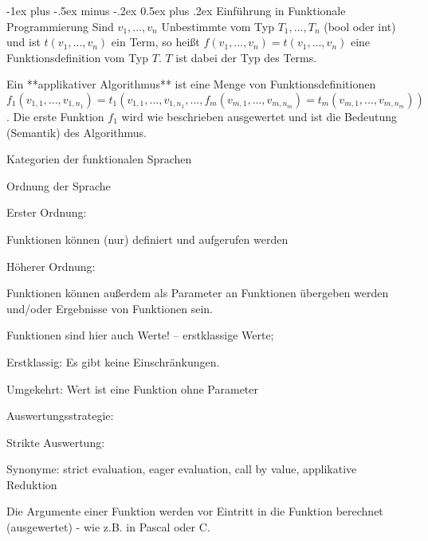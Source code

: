 \documentclass[10pt]{article}
\makeatletter
\renewcommand{\section}{\@startsection{section}{1}{0mm}%
                                {-1ex plus -.5ex minus -.2ex}%
                                {0.5ex plus .2ex}%
                                {\normalfont\large\bfseries}}
\makeatother
\begin{document}
\section{Einführung in Funktionale Programmierung}
Sind $v_1, ..., v_n$ Unbestimmte vom Typ $T_1, ..., T_n$ (bool oder int) und ist $t(v_1,...,v_n)$ ein Term, so heißt $f(v_1,...,v_n)= t(v_1,...,v_n)$ eine Funktionsdefinition vom Typ $T$. $T$ ist dabei der Typ des Terms.

Ein **applikativer Algorithmus** ist eine Menge von Funktionsdefinitionen $f_1(v_{1,1}, ..., v_{1,n_1}) = t_1(v_{1,1},...,v_{1,n_1},..., f_m(v_{m,1},...,v_{m,n_m}) = t_m(v_{m,1},..., v_{m,n_m}))$. Die erste Funktion $f_1$ wird wie beschrieben ausgewertet und ist die Bedeutung (Semantik) des Algorithmus.

Kategorien der funktionalen Sprachen
\begin{itemize*}
  \item Ordnung der Sprache
  \begin{itemize*}
    \item Erster Ordnung:
    \begin{itemize*}
      \item Funktionen können (nur) definiert und aufgerufen werden
    \end{itemize*}
    \item Höherer Ordnung:
    \begin{itemize*}
      \item Funktionen können außerdem als Parameter an Funktionen übergeben werden und/oder Ergebnisse von Funktionen sein.
      \item Funktionen sind hier auch Werte! -- erstklassige Werte;
      \item Erstklassig: Es gibt keine Einschränkungen.
      \item Umgekehrt: Wert ist eine Funktion ohne Parameter
    \end{itemize*}
  \end{itemize*}
  \item Auswertungsstrategie:
  \begin{itemize*}
    \item Strikte Auswertung:
    \begin{itemize*}
      \item Synonyme: strict evaluation, eager evaluation, call by value, applikative Reduktion
      \item Die Argumente einer Funktion werden vor Eintritt in die Funktion berechnet (ausgewertet) - wie z.B. in Pascal oder C.

\end{itemize*}
\end{itemize*}
\end{itemize*}
\end{document}
